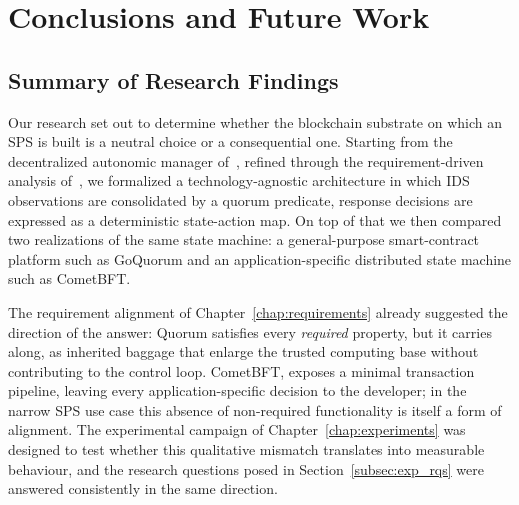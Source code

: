 
\chapter{Conclusions and Future Work}
\label{chap:conclusions}

\section{Summary of Research Findings}
\label{sec:conc_summary}

Our research set out to determine whether the blockchain substrate on which an SPS is built is a neutral choice or a consequential one. Starting from the decentralized autonomic manager of~\cite{albero2026blockchain}, refined through the requirement-driven analysis of~\cite{albero2026blockchain}, we formalized a technology-agnostic architecture in which IDS observations are consolidated by a quorum predicate, response decisions are expressed as a deterministic state-action map. On top of that we then compared two realizations of the same state machine: a general-purpose smart-contract platform such as GoQuorum and an application-specific distributed state machine such as CometBFT.

The requirement alignment of Chapter~\ref{chap:requirements} already suggested the direction of the answer: Quorum satisfies every \emph{required} property, but it carries along, as inherited baggage that enlarge the trusted computing base without contributing to the control loop. CometBFT, exposes a minimal transaction pipeline, leaving every application-specific decision to the developer; in the narrow SPS use case this absence of non-required functionality is itself a form of alignment. The experimental campaign of Chapter~\ref{chap:experiments} was designed to test whether this qualitative mismatch translates into measurable behaviour, and the research questions posed in Section~\ref{subsec:exp_rqs} were answered consistently in the same direction.

